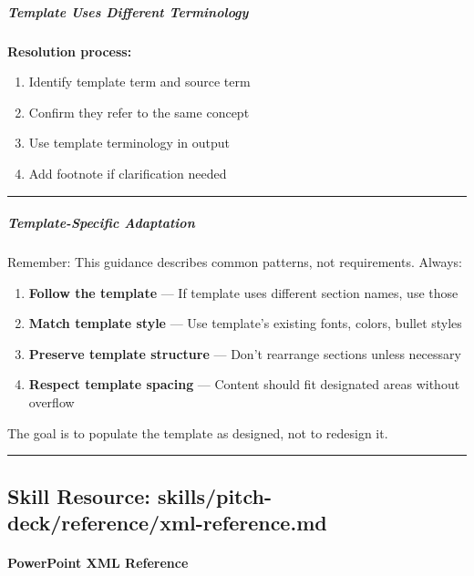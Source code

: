 \documentclass[11pt]{article}
\begin{document}
\subparagraph{Template Uses Different Terminology}\mbox{}\par

\textbf{Resolution process:}

\begin{enumerate}[leftmargin=*,itemsep=2pt,topsep=2pt]
\item {} Identify template term and source term
\item {} Confirm they refer to the same concept
\item {} Use template terminology in output
\item {} Add footnote if clarification needed
\end{enumerate}

\vspace{0.5em}\hrule\vspace{0.5em}

\subparagraph{Template-Specific Adaptation}\mbox{}\par

Remember: This guidance describes common patterns, not requirements. Always:


\begin{enumerate}[leftmargin=*,itemsep=2pt,topsep=2pt]
\item {} \textbf{Follow the template} — If template uses different section names, use those
\item {} \textbf{Match template style} — Use template's existing fonts, colors, bullet styles
\item {} \textbf{Preserve template structure} — Don't rearrange sections unless necessary
\item {} \textbf{Respect template spacing} — Content should fit designated areas without overflow
\end{enumerate}

The goal is to populate the template as designed, not to redesign it.


\vspace{0.8em}\hrule\vspace{0.8em}

\subsection{Skill Resource: skills/pitch-deck/reference/xml-reference.md}\label{file:skills-pitch-deck-reference-xml-reference.md}

\paragraph{PowerPoint XML Reference}\mbox{}\par
\end{document}

